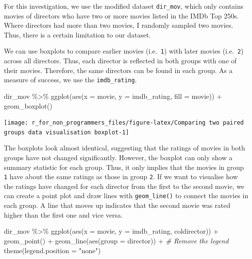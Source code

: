 \documentclass[
]{book}
\newenvironment{Shaded}{\begin{snugshade}}{\end{snugshade}}
\newcommand{\AttributeTok}[1]{\textcolor[rgb]{0.77,0.63,0.00}{#1}}
\newcommand{\CommentTok}[1]{\textcolor[rgb]{0.56,0.35,0.01}{\textit{#1}}}
\newcommand{\FunctionTok}[1]{\textcolor[rgb]{0.00,0.00,0.00}{#1}}
\newcommand{\NormalTok}[1]{#1}
\newcommand{\SpecialCharTok}[1]{\textcolor[rgb]{0.00,0.00,0.00}{#1}}
\newcommand{\StringTok}[1]{\textcolor[rgb]{0.31,0.60,0.02}{#1}}
\begin{document}
For this investigation, we use the modified dataset \texttt{dir\_mov}, which only contains movies of directors who have two or more movies listed in the IMDb Top 250s. Where directors had more than two movies, I randomly sampled two movies. Thus, there is a certain limitation to our dataset.

We can use boxplots to compare earlier movies (i.e.~\texttt{1}) with later movies (i.e.~\texttt{2}) across all directors. Thus, each director is reflected in both groups with one of their movies. Therefore, the same directors can be found in each group. As a measure of success, we use the \texttt{imdb\_rating}.

\begin{Shaded}
\begin{Highlighting}[]
\NormalTok{dir\_mov }\SpecialCharTok{\%\textgreater{}\%}
  \FunctionTok{ggplot}\NormalTok{(}\FunctionTok{aes}\NormalTok{(}\AttributeTok{x =}\NormalTok{ movie, }\AttributeTok{y =}\NormalTok{ imdb\_rating, }\AttributeTok{fill =}\NormalTok{ movie)) }\SpecialCharTok{+}
  \FunctionTok{geom\_boxplot}\NormalTok{()}
\end{Highlighting}
\end{Shaded}

\begin{center}\texttt{[image: r\_for\_non\_programmers\_files/figure-latex/Comparing two paired groups data visualisation boxplot-1]} \end{center}

The boxplots look almost identical, suggesting that the ratings of movies in both groups have not changed significantly. However, the boxplot can only show a summary statistic for each group. Thus, it only implies that the movies in group \texttt{1} have about the same ratings as those in group \texttt{2}. If we want to visualise how the ratings have changed for each director from the first to the second movie, we can create a point plot and draw lines with \texttt{geom\_line()} to connect the movies in each group. A line that moves up indicates that the second movie was rated higher than the first one and vice versa.

\begin{Shaded}
\begin{Highlighting}[]
\NormalTok{dir\_mov }\SpecialCharTok{\%\textgreater{}\%}
  \FunctionTok{ggplot}\NormalTok{(}\FunctionTok{aes}\NormalTok{(}\AttributeTok{x =}\NormalTok{ movie, }\AttributeTok{y =}\NormalTok{ imdb\_rating, coldirector)) }\SpecialCharTok{+}
  \FunctionTok{geom\_point}\NormalTok{() }\SpecialCharTok{+}
  \FunctionTok{geom\_line}\NormalTok{(}\FunctionTok{aes}\NormalTok{(}\AttributeTok{group =}\NormalTok{ director)) }\SpecialCharTok{+}
  \CommentTok{\# Remove the legend}
  \FunctionTok{theme}\NormalTok{(}\AttributeTok{legend.position =} \StringTok{"none"}\NormalTok{)}
\end{Highlighting}
\end{Shaded}
\end{document}
